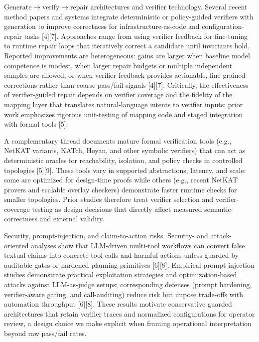 \documentclass[conference]{IEEEtran}
\begin{document}
Generate\ensuremath{\rightarrow}verify\ensuremath{\rightarrow}repair architectures and verifier technology. Several recent method papers and systems integrate deterministic or policy-guided verifiers with generation to improve correctness for infrastructure-as-code and configuration-repair tasks [4][7]. Approaches range from using verifier feedback for fine-tuning to runtime repair loops that iteratively correct a candidate until invariants hold. Reported improvements are heterogeneous: gains are larger when baseline model competence is modest, when larger repair budgets or multiple independent samples are allowed, or when verifier feedback provides actionable, fine-grained corrections rather than coarse pass/fail signals [4][7]. Critically, the effectiveness of verifier-guided repair depends on verifier coverage and the fidelity of the mapping layer that translates natural-language intents to verifier inputs; prior work emphasizes rigorous unit-testing of mapping code and staged integration with formal tools [5].

A complementary thread documents mature formal verification tools (e.g., NetKAT variants, KATch, Hoyan, and other symbolic verifiers) that can act as deterministic oracles for reachability, isolation, and policy checks in controlled topologies [5][9]. These tools vary in supported abstractions, latency, and scale: some are optimized for design-time proofs while others (e.g., recent NetKAT provers and scalable overlay checkers) demonstrate faster runtime checks for smaller topologies. Prior studies therefore treat verifier selection and verifier-coverage testing as design decisions that directly affect measured semantic-correctness and external validity.

Security, prompt-injection, and claim-to-action risks. Security- and attack-oriented analyses show that LLM-driven multi-tool workflows can convert false textual claims into concrete tool calls and harmful actions unless guarded by auditable gates or hardened planning primitives [6][8]. Empirical prompt-injection studies demonstrate practical exploitation strategies and optimization-based attacks against LLM-as-judge setups; corresponding defenses (prompt hardening, verifier-aware gating, and call-auditing) reduce risk but impose trade-offs with automation throughput [6][8]. These results motivate conservative guarded architectures that retain verifier traces and normalized configurations for operator review, a design choice we make explicit when framing operational interpretation beyond raw pass/fail rates.
\end{document}
